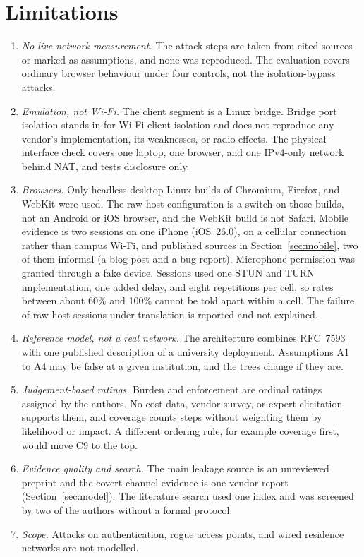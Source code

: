 \documentclass[conference]{IEEEtran}
\begin{document}
\section{Limitations}
\label{sec:limits}
\begin{enumerate}
\item \textit{No live-network measurement.} The attack steps are taken from cited sources or marked as assumptions, and none was reproduced. The evaluation covers ordinary browser behaviour under four controls, not the isolation-bypass attacks.
\item \textit{Emulation, not Wi-Fi.} The client segment is a Linux bridge. Bridge port isolation stands in for Wi-Fi client isolation and does not reproduce any vendor's implementation, its weaknesses, or radio effects. The physical-interface check covers one laptop, one browser, and one IPv4-only network behind NAT, and tests disclosure only.
\item \textit{Browsers.} Only headless desktop Linux builds of Chromium, Firefox, and WebKit were used. The raw-host configuration is a switch on those builds, not an Android or iOS browser, and the WebKit build is not Safari. Mobile evidence is two sessions on one iPhone (iOS~26.0), on a cellular connection rather than campus Wi-Fi, and published sources in Section~\ref{sec:mobile}, two of them informal (a blog post and a bug report). Microphone permission was granted through a fake device. Sessions used one STUN and TURN implementation, one added delay, and eight repetitions per cell, so rates between about 60\% and 100\% cannot be told apart within a cell. The failure of raw-host sessions under translation is reported and not explained.
\item \textit{Reference model, not a real network.} The architecture combines RFC~7593 with one published description of a university deployment. Assumptions A1 to A4 may be false at a given institution, and the trees change if they are.
\item \textit{Judgement-based ratings.} Burden and enforcement are ordinal ratings assigned by the authors. No cost data, vendor survey, or expert elicitation supports them, and coverage counts steps without weighting them by likelihood or impact. A different ordering rule, for example coverage first, would move C9 to the top.
\item \textit{Evidence quality and search.} The main leakage source is an unreviewed preprint and the covert-channel evidence is one vendor report (Section~\ref{sec:model}). The literature search used one index and was screened by two of the authors without a formal protocol.
\item \textit{Scope.} Attacks on authentication, rogue access points, and wired residence networks are not modelled.
\end{enumerate}
\end{document}
